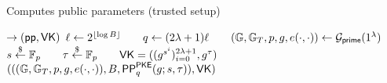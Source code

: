 \begin{algorithm}[H]
    \begin{algorithmic}[1]
    \caption{\small Computes public parameters (trusted setup)}
    \label{a:aas:setup}
     $\rightarrow (\mathsf{pp}, \mathsf{VK})$ 
        \State
            $\ell \gets 2^{\lfloor\log{\ensuremath{B}}\rfloor} \qquad
             q \gets (2\lambda + 1)\ell \qquad
             ( \mathbb{G},\mathbb{G}_T,p,g,e(\cdot,\cdot) ) \leftarrow \mathcal{G}_{\mathsf{prime}}(1^\lambda)$
        \State
            $s\stackrel{\$}{\gets} \mathbb{F}_p \qquad
             \tau\stackrel{\$}{\gets} \mathbb{F}_p \qquad
             \mathsf{VK}=((g^{s^i})_{i=0}^{2\lambda + 1}, g^\tau)$
        \State \Return $((( \mathbb{G},\mathbb{G}_T,p,g,e(\cdot,\cdot) ), B, \mathsf{PP}^\mathsf{PKE}_q(g; s,\tau)), \mathsf{VK} )$
    \EndFunction
    \end{algorithmic}
\end{algorithm}

